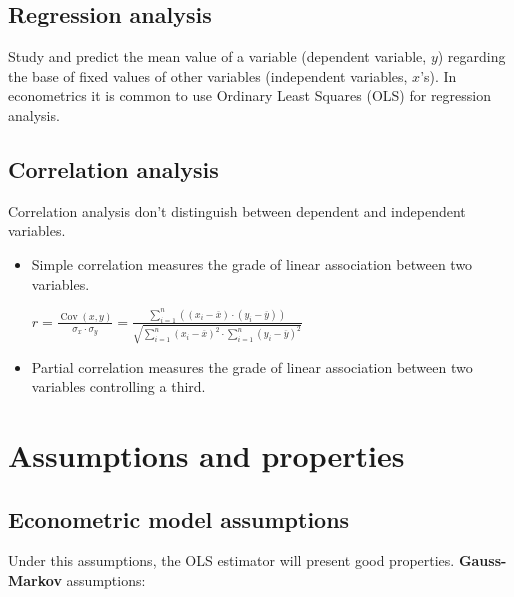\documentclass[10pt, a4paper, landscape]{article}
\DeclareMathOperator{\Cov}{Cov}
\begin{document}
\begin{multicols}{3}
\subsection*{Regression analysis}

Study and predict the mean value of a variable (dependent variable, \( y \)) regarding the base of fixed values of other variables (independent variables, \( x \)'s). In econometrics it is common to use Ordinary Least Squares (OLS) for regression analysis.

\subsection*{Correlation analysis}

Correlation analysis don't distinguish between dependent and independent variables.

\begin{itemize}[leftmargin=*]
	\item Simple correlation measures the grade of linear association between two variables.
	\begin{center}
		\( r = \frac{\Cov(x, y)}{\sigma_{x} \cdot \sigma_{y}} = \frac{\sum_{i = 1}^{n} \left( (x_{i} - \overline{x}) \cdot (y_{i} - \overline{y}) \right)}{\sqrt{\sum_{i = 1}^{n} (x_{i} - \overline{x})^{2} \cdot \sum_{i = 1}^{n} (y_{i} - \overline{y})^{2}}} \)
	\end{center}
	\item Partial correlation measures the grade of linear association between two variables controlling a third.
\end{itemize}

\columnbreak

\section*{Assumptions and properties}

\subsection*{Econometric model assumptions}

Under this assumptions, the OLS estimator will present good properties. \textbf{Gauss-Markov} assumptions:


\end{multicols}
\end{document}
